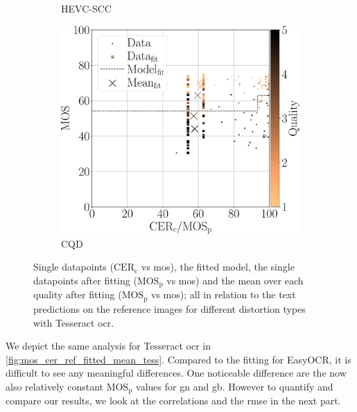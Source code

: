\begin{figure}
\begin{subfigure}[b]{0.32\textwidth}
        \caption{HEVC-SCC}
        \label{fig:mos_cer_ref_fitted_mean_tess_HEVC-SCC}
    \end{subfigure}%
    \hfill
    \begin{subfigure}[b]{0.32\textwidth}
        \includegraphics[width=\textwidth]{../../images/analyze/mos_cer_ref_fitted_mean_tess_CQD.pdf}
        \caption{CQD}
        \label{fig:mos_cer_ref_fitted_mean_tess_CQD}
    \end{subfigure}%
    \caption{Single datapoints ($\text{CER}_{\text{c}}$ vs \gls{mos}), the fitted model, the single datapoints after fitting ($\text{MOS}_{\text{p}}$ vs \gls{mos}) and the mean over each quality after fitting ($\text{MOS}_{\text{p}}$ vs \gls{mos}); all in relation to the text predictions on the reference images for different distortion types with Tesseract \gls{ocr}.}
\label{fig:mos_cer_ref_fitted_mean_tess}
\end{figure}
We depict the same analysis for Tesseract \gls{ocr} in \autoref{fig:mos_cer_ref_fitted_mean_tess}.
Compared to the fitting for EasyOCR, it is difficult to see any meaningful differences.
One noticeable difference are the now also relatively constant $\text{MOS}_{\text{p}}$ values for \gls{gn} and \gls{gb}.
However to quantify and compare our results, we look at the correlations and the \gls{rmse} in the next part.

